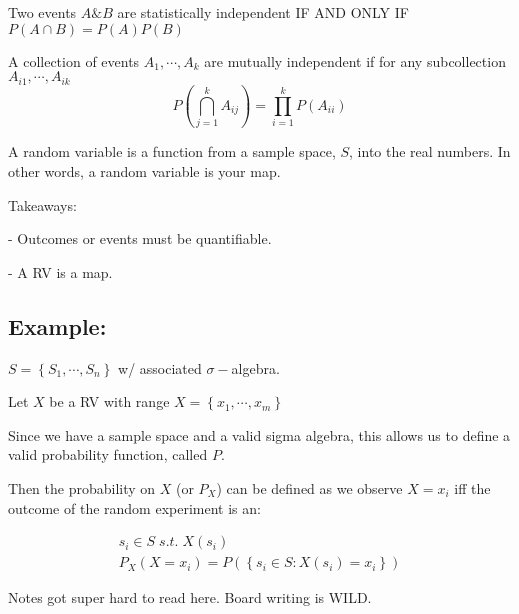 \documentclass[a4paper]{article}
\begin{document}
\begin{definition}[1.3.7: Independence]
	Two events $A \& B$ are statistically independent IF AND ONLY IF $P(A \cap B) = P(A)P(B)$
\end{definition}

\begin{definition}[1.3.12]
	A collection of events $A_1, \cdots, A_k$ are mutually independent if for any subcollection $A_{i1}, \cdots, A_{ik}$
	\[P\left( \bigcap_{j=1}^{k} A_{ij} \right) = \prod_{i=1}^{k} P(A_{ii})\]
\end{definition}

\begin{definition}
	A random variable is a function from a sample space, $S$, into the real numbers. In other words, a random variable is your map. 
\end{definition}

Takeaways:

- Outcomes or events must be quantifiable. 

- A RV is a map. 

\subsection{Example:}

$S = \left\{ S_1, \cdots, S_n \right\}$ w/ associated $\sigma-$algebra. 

Let $X$ be a RV with range $X = \left\{ x_1, \cdots, x_m \right\}$

Since we have a sample space and a valid sigma algebra, this allows us to define a valid probability function, called $P$.

Then the probability on $X$ (or $P_X$) can be defined as we observe $X=x_i$ iff the outcome of the random experiment is an:

\begin{align}
	s_i \in S \; s.t. \; X(s_i) \\
	P_X(X=x_i) = P(\left\{ s_i \in S : X(s_i) = x_i \right\})
\end{align}

Notes got super hard to read here. Board writing is WILD.
\end{document}
